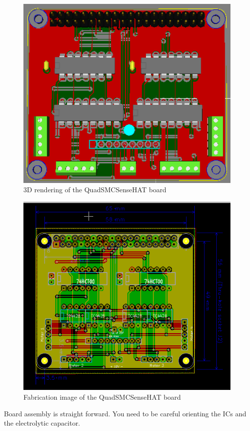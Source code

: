\begin{figure}[hbpt]\begin{centering}%
\includegraphics[width=5in]{QuadSMCSenseHat3DTop.png}
\caption{3D rendering of the QuadSMCSenseHAT board}
\end{centering}\end{figure}
\begin{figure}[hbpt]\begin{centering}%
\includegraphics[width=5in]{QuadSMCSenseHat.png}
\caption{Fabrication image of the QuadSMCSenseHAT board}
\end{centering}\end{figure}
Board assembly is straight forward. You need to be careful orienting the ICs
and the electrolytic capacitor.

